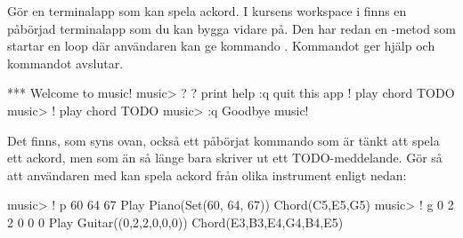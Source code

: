 {%




\Task Gör en terminalapp som kan spela ackord. I kursens workspace i  finns en påbörjad terminalapp som du kan bygga vidare på. Den har redan en -metod som startar en loop där användaren kan ge kommando . Kommandot  ger hjälp och kommandot  avslutar.

\begin{REPL}
*** Welcome to music!
music> ?
?         print help
:q        quit this app
!         play chord TODO
music> !
play chord TODO
music> :q
Goodbye music!
\end{REPL}

Det finns, som syns ovan, också ett påbörjat kommando \code{!} som är tänkt att spela ett ackord, men som än så länge bara skriver ut ett TODO-meddelande. Gör så att användaren med \code{!} kan spela ackord från olika instrument enligt nedan:

\begin{REPL}
music> ! p 60 64 67
Play Piano(Set(60, 64, 67)) Chord(C5,E5,G5)
music> ! g 0 2 2 0 0 0
Play Guitar((0,2,2,0,0,0)) Chord(E3,B3,E4,G4,B4,E5)
\end{REPL}


}
